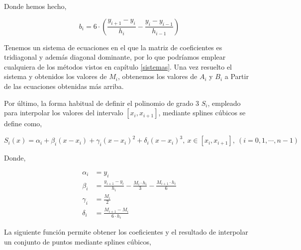 \begin{paracol}{2}
Donde hemos hecho,
\end{paracol}
\begin{equation*}
b_i=6\cdot \left(\frac{y_{i+1}-y_i}{h_i}-\frac{y_i-y_{i-1}}{h_{i-1}}\right)
\end{equation*}
\begin{paracol}{2}
Tenemos un sistema de ecuaciones en el que la matriz de coeficientes es tridiagonal y además diagonal dominante, por lo que podríamos emplear cualquiera de los métodos vistos en capítulo  
\ref{sistemas}.  Una vez resuelto el sistema y obtenidos los valores de $M_i$, obtenemos los valores de $A_i$ y $B_i$ a Partir de las ecuaciones obtenidas más arriba.

Por último, la forma habitual de definir el polinomio de grado 3 $S_i$, empleado para interpolar los valores del intervalo $[x_i,x_{i+1}]$, mediante splines cúbicos se define como, 
\end{paracol}
\begin{equation*}
S_i(x)=\alpha_i+\beta_i(x-x_i)+\gamma_i(x-x_i)^2+\delta_i(x-x_i)^3, \ x\in [x_i,x_{i+1}],\ (i=0,1,\cdots,n-1)
\end{equation*}
\begin{paracol}{2}
Donde,
\end{paracol}
\begin{align*}
\alpha_i &=y_i\\
\beta_i &=\frac{y_{i+1}-y_i}{h_i}-\frac{M_i \cdot h_i}{3}-\frac{M_{i+1} \cdot h_i}{6}\\
\gamma_i &=\frac{M_i}{2}\\
\delta_i &=\frac{M_{i+1}-M_i}{6\cdot h_i}
\end{align*}
\begin{paracol}{2}
La siguiente función permite obtener los coeficientes y el resultado de interpolar un conjunto de puntos mediante splines cúbicos,
\end{paracol}

